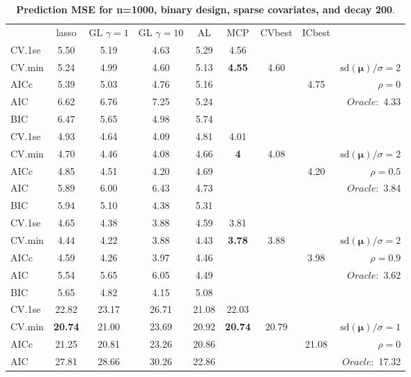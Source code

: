 \clearpage
\begin{table}\vspace{-.5cm}
\caption[l]{ { \bf Prediction MSE for n=1000, binary design, 
sparse covariates, and  decay  200}.}
\vspace{-.5cm}
\footnotesize{}
\begin{center}
\begin{tabular}{l*{7}{c}|r}
 & lasso & GL $\gamma=1$ & GL $\gamma=10$ & AL & MCP  & CVbest & ICbest  \\
\cline{1-9}
CV.1se & 5.50 & 5.19 & 4.63 & 5.29 & 4.56 & & & \\
CV.min & 5.24 & 4.99 & 4.60 & 5.13 & {\bf 4.55} & 4.60 & & $\mathrm{sd}(\mathbf{\mu})/\sigma=2$ \\
AICc & 5.39 & 5.03 & 4.76 & 5.16 & & & 4.75 &  $\rho=0$ \\
AIC & 6.62 & 6.76 & 7.25 & 5.24 & & & &  \multirow{2}{*}{$Oracle: $ 4.33} \\
BIC & 6.47 & 5.65 & 4.98 & 5.74 & & & &  \\
 \hline 
CV.1se & 4.93 & 4.64 & 4.09 & 4.81 & 4.01 & & & \\
CV.min & 4.70 & 4.46 & 4.08 & 4.66 & {\bf 4} & 4.08 & & $\mathrm{sd}(\mathbf{\mu})/\sigma=2$ \\
AICc & 4.85 & 4.51 & 4.20 & 4.69 & & & 4.20 &  $\rho=0.5$ \\
AIC & 5.89 & 6.00 & 6.43 & 4.73 & & & &  \multirow{2}{*}{$Oracle: $ 3.84} \\
BIC & 5.94 & 5.10 & 4.38 & 5.31 & & & &  \\
 \hline 
CV.1se & 4.65 & 4.38 & 3.88 & 4.59 & 3.81 & & & \\
CV.min & 4.44 & 4.22 & 3.88 & 4.43 & {\bf 3.78} & 3.88 & & $\mathrm{sd}(\mathbf{\mu})/\sigma=2$ \\
AICc & 4.59 & 4.26 & 3.97 & 4.46 & & & 3.98 &  $\rho=0.9$ \\
AIC & 5.54 & 5.65 & 6.05 & 4.49 & & & &  \multirow{2}{*}{$Oracle: $ 3.62} \\
BIC & 5.65 & 4.82 & 4.15 & 5.08 & & & &  \\
 \hline 
CV.1se & 22.82 & 23.17 & 26.71 & 21.08 & 22.03 & & & \\
CV.min & {\bf 20.74} & 21.00 & 23.69 & 20.92 & {\bf 20.74} & 20.79 & & $\mathrm{sd}(\mathbf{\mu})/\sigma=1$ \\
AICc & 21.25 & 20.81 & 23.26 & 20.86 & & & 21.08 &  $\rho=0$ \\
AIC & 27.81 & 28.66 & 30.26 & 22.86 & & & &  \multirow{2}{*}{$Oracle: $ 17.32} \\

\end{tabular}
\end{center}
\end{table}
